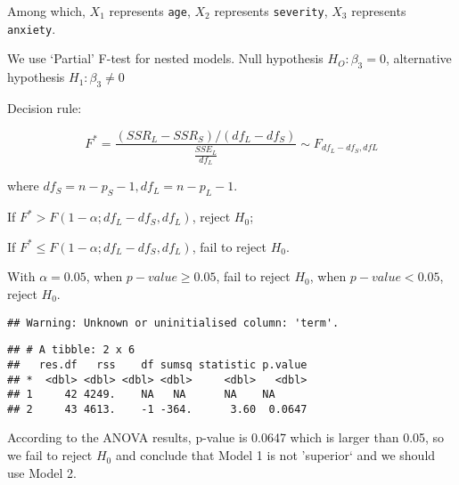 \documentclass[]{article}
\newenvironment{Shaded}{\begin{snugshade}}{\end{snugshade}}
\newcommand{\KeywordTok}[1]{\textcolor[rgb]{0.13,0.29,0.53}{\textbf{#1}}}
\newcommand{\DataTypeTok}[1]{\textcolor[rgb]{0.13,0.29,0.53}{#1}}
\newcommand{\StringTok}[1]{\textcolor[rgb]{0.31,0.60,0.02}{#1}}
\newcommand{\OperatorTok}[1]{\textcolor[rgb]{0.81,0.36,0.00}{\textbf{#1}}}
\newcommand{\NormalTok}[1]{#1}
\begin{document}
Among which, \(X_1\) represents \texttt{age}, \(X_2\) represents
\texttt{severity}, \(X_3\) represents \texttt{anxiety}.

We use `Partial' F-test for nested models. Null hypothesis
\(H_O: \beta_3 = 0\), alternative hypothesis \(H_1: \beta_3 \neq 0\)

Decision rule:

\[ F^*=\frac{(SSR_L-SSR_S)/(df_L-df_S)}{\frac{SSE_L}{df_L}} \sim F_{df_L-df_S,dfL} \]

where \(df_S = n-p_S-1, df_L = n-p_L-1\).

If \(F^* > F(1-\alpha;df_L-df_S,df_L)\), reject \(H_0\);

If \(F^* \leq F(1-\alpha;df_L-df_S,df_L)\), fail to reject \(H_0\).

With \(\alpha = 0.05\), when \(p-value \geq 0.05\), fail to reject
\(H_0\), when \(p-value < 0.05\), reject \(H_0\).

\begin{Shaded}
\end{Shaded}

\begin{verbatim}
## Warning: Unknown or uninitialised column: 'term'.
\end{verbatim}

\begin{verbatim}
## # A tibble: 2 x 6
##   res.df   rss    df sumsq statistic p.value
## *  <dbl> <dbl> <dbl> <dbl>     <dbl>   <dbl>
## 1     42 4249.    NA   NA      NA    NA     
## 2     43 4613.    -1 -364.      3.60  0.0647
\end{verbatim}

According to the ANOVA results, p-value is 0.0647 which is larger than
0.05, so we fail to reject \(H_0\) and conclude that Model 1 is not
'superior` and we should use Model 2.
\end{document}
